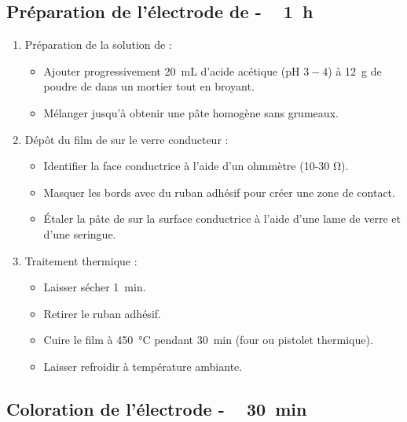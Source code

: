 \documentclass[twoside,a4paper,11pt,addpoints,answers]{exam}%
\begin{document}
\subsection{Préparation de l'électrode de  - \faClockO ~ \SI{1}{\hour}}
\begin{enumerate}
\item Préparation de la solution de  :
\begin{itemize}
\item Ajouter progressivement \SI{20}{\milli\liter}  d'acide acétique (pH $3-4$) à \SI{12}{\gram} de poudre de  dans un mortier tout en broyant.
\item Mélanger jusqu'à obtenir une pâte homogène sans grumeaux.
\end{itemize}

\item Dépôt du film de  sur le verre conducteur :
\begin{itemize}
\item Identifier la face conductrice à l'aide d'un ohmmètre (10-30 Ω).
\item Masquer les bords avec du ruban adhésif pour créer une zone de contact.
\item Étaler la pâte de  sur la surface conductrice à l'aide d'une lame de verre et d'une seringue.
\end{itemize}


\item Traitement thermique :
\begin{itemize}
\item Laisser sécher \SI{1}{\minute}.
\item Retirer le ruban adhésif.
\item Cuire le film à \SI{450}{\celsius} pendant \SI{30}{\minute} (four ou pistolet thermique).
\item Laisser refroidir à température ambiante.
\end{itemize}
\end{enumerate}

\subsection{Coloration de l’électrode - \faClockO ~ \SI{30}{\minute}}
\end{document}
